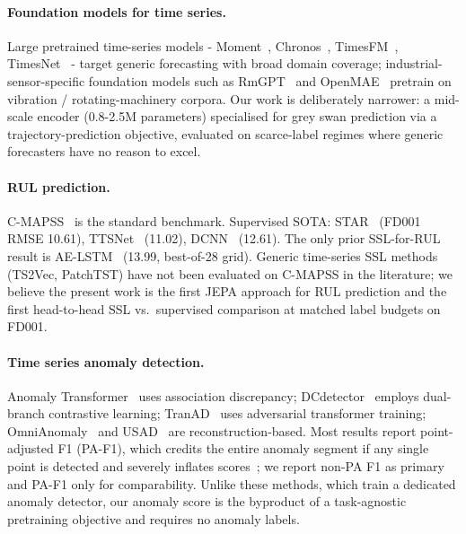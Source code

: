 \documentclass{article}
\begin{document}
\paragraph{Foundation models for time series.}
Large pretrained time-series models - Moment~\citep{goswami2024moment}, Chronos~\citep{ansari2024chronos}, TimesFM~\citep{das2024timesfm}, TimesNet~\citep{wu2023timesnet} - target generic forecasting with broad domain coverage; industrial-sensor-specific foundation models such as RmGPT~\citep{wang2025rmgpt} and OpenMAE~\citep{openMAE2025} pretrain on vibration / rotating-machinery corpora. Our work is deliberately narrower: a mid-scale encoder (0.8-2.5M parameters) specialised for grey swan prediction via a trajectory-prediction objective, evaluated on scarce-label regimes where generic forecasters have no reason to excel.

\paragraph{RUL prediction.}
C-MAPSS~\citep{saxena2008cmapss} is the standard benchmark. Supervised SOTA: STAR~\citep{fan2024star} (FD001 RMSE 10.61), TTSNet~\citep{ttsnet2025} (11.02), DCNN~\citep{li2018dcnn} (12.61). The only prior SSL-for-RUL result is AE-LSTM~\citep{lecam2025aelstm} (13.99, best-of-28 grid). Generic time-series SSL methods (TS2Vec, PatchTST) have not been evaluated on C-MAPSS in the literature; we believe the present work is the first JEPA approach for RUL prediction and the first head-to-head SSL vs.\ supervised comparison at matched label budgets on FD001.

\paragraph{Time series anomaly detection.}
Anomaly Transformer~\citep{xu2022anomalytransformer} uses association discrepancy; DCdetector~\citep{yang2023dcdetector} employs dual-branch contrastive learning; TranAD~\citep{tuli2022tranad} uses adversarial transformer training; OmniAnomaly~\citep{su2019omnianomaly} and USAD~\citep{audibert2020usad} are reconstruction-based. Most results report point-adjusted F1 (PA-F1), which credits the entire anomaly segment if any single point is detected and severely inflates scores~\citep{schmidl2022tsadeval}; we report non-PA F1 as primary and PA-F1 only for comparability. Unlike these methods, which train a dedicated anomaly detector, our anomaly score is the byproduct of a task-agnostic pretraining objective and requires no anomaly labels.
\end{document}
